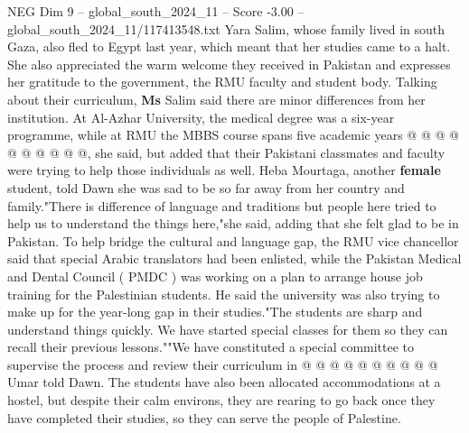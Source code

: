 \begin{textsample}{NEG Dim 9 – global\_south\_2024\_11 – Score -3.00 – global\_south\_2024\_11/117413548.txt}
Yara Salim, whose family lived in south Gaza, also fled to Egypt last year, which meant that her studies came to a halt.
She also appreciated the warm welcome they received in Pakistan and expresses her gratitude to the government, the RMU faculty and student body.
Talking about their curriculum, \textbf{Ms} Salim said there are minor differences from her institution.
At Al-Azhar University, the medical degree was a six-year programme, while at RMU the MBBS course spans five academic years @ @ @ @ @ @ @ @ @ @, she said, but added that their Pakistani classmates and faculty were trying to help those individuals as well.
Heba Mourtaga, another \textbf{female} student, told Dawn she was sad to be so far away from her country and family."There is difference of language and traditions but people here tried to help us to understand the things here,"she said, adding that she felt glad to be in Pakistan.
To help bridge the cultural and language gap, the RMU vice chancellor said that special Arabic translators had been enlisted, while the Pakistan Medical and Dental Council ( PMDC ) was working on a plan to arrange house job training for the Palestinian students.
He said the university was also trying to make up for the year-long gap in their studies."The students are sharp and understand things quickly.
We have started special classes for them so they can recall their previous lessons.""We have constituted a special committee to supervise the process and review their curriculum in @ @ @ @ @ @ @ @ @ @ Umar told Dawn.
The students have also been allocated accommodations at a hostel, but despite their calm environs, they are rearing to go back once they have completed their studies, so they can serve the people of Palestine.

\end{textsample}
